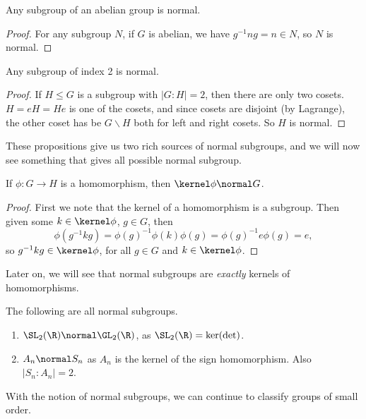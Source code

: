 \documentclass[a4paper]{scrartcl}
\begin{document}
\begin{proposition}
	Any subgroup of an abelian group is normal.
\end{proposition}
\begin{proof}
	For any subgroup $N$,
	if $G$ is abelian, we have $g^{-1}n g = n \in N$, so $N$ is normal.
\end{proof}

\begin{proposition}
	Any subgroup of index 2 is normal.
\end{proposition}
\begin{proof}
	If $H \leq G$ is a subgroup with $|G:H| = 2$, then there are only two cosets. $H = eH = He$ is one of the cosets, and since cosets are disjoint (by Lagrange), the other coset has be $G\backslash H$ both for left and right cosets. So $H$ is normal.
\end{proof}

These propositions give us two rich sources of normal subgroups, and we will now see something that gives all possible normal subgroup.

\begin{proposition}
	If $\phi : G \rightarrow H$ is a homomorphism, then $\kernel \phi \normal G$.
\end{proposition}
\begin{proof}
	First we note that the kernel of a homomorphism is a subgroup. Then given some $k \in \kernel \phi$, $g \in G$, then
	$$
	\phi(g^{-1} k g) = \phi(g)^{-1} \phi(k) \phi(g) = \phi(g)^{-1} e \phi(g) = e,
	$$
	so $g^{-1} k g \in \kernel \phi$, for all $g \in G$ and $k \in \kernel \phi$.
\end{proof}

Later on, we will see that normal subgroups are \emph{exactly} kernels of homomorphisms.

\begin{example}
	The following are all normal subgroups.
	\begin{enumerate}
		\item $\SL_2(\R) \normal \GL_2(\R)$, as $\SL_2(\R) = \ker(\det)$.
		\item $A_n \normal S_n$ as $A_n$ is the kernel of the sign homomorphism. Also $|S_n : A_n| = 2$.
	\end{enumerate}
\end{example}

With the notion of normal subgroups, we can continue to classify groups of small order.
\end{document}
